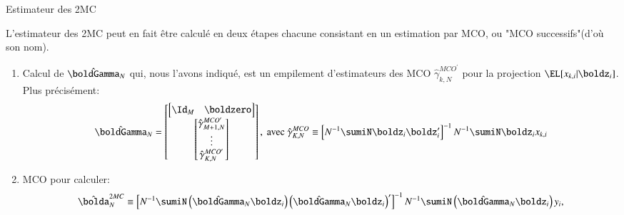 \begin{frame}[allowframebreaks]{Estimateur des 2MC}
\framebreak 

\begin{remark_fr}
L'estimateur des 2MC peut en fait être calculé en deux étapes  
chacune consistant en un estimation par MCO, ou "MCO successifs"(d'où son nom).
\begin{enumerate}
\item Calcul de $\hat{\boldGamma}_N$  qui, nous l'avons indiqué, est 
un empilement d'estimateurs des MCO $ \hat{\gamma}_{k, N}^{MCO^\prime}$ 
pour la projection $\EL[x_{k, i}| \boldz_i]$. Plus précisément:
\begin{align*}
    \hat{\boldGamma}_N = 
    \begin{bmatrix}
        \begin{bmatrix}
            \Id_M&\boldzero
        \end{bmatrix}\\
        \begin{bmatrix}
            \hat{\gamma}_{M+1, N}^{MCO^\prime}\\
            \vdots\\
            \hat{\gamma}_{K, N}^{MCO^\prime}
        \end{bmatrix}
    \end{bmatrix},
\ \text{avec} \
    \hat{\gamma}_{K, N}^{MCO} \equiv \left[N^{-1}\sumiN\boldz_i\boldz_i^\prime\right]^{-1}
    N^{-1}\sumiN\boldz_ix_{k, i}
\end{align*}

\item MCO pour calculer:
    \begin{align*}
        \hat{\bolda}^{2MC}_N \equiv \left[
            N^{-1}\sumiN \left( \hat{\boldGamma}_N\boldz_i \right)
            \left(\hat{\boldGamma}_N\boldz_i\right)^\prime
        \right]^{-1}N^{-1}
        \sumiN  \left(\hat{\boldGamma}_N\boldz_i\right)y_i,
    \end{align*}
\end{enumerate}
\label{rm13}
\end{remark_fr}

\framebreak 


\end{frame}

